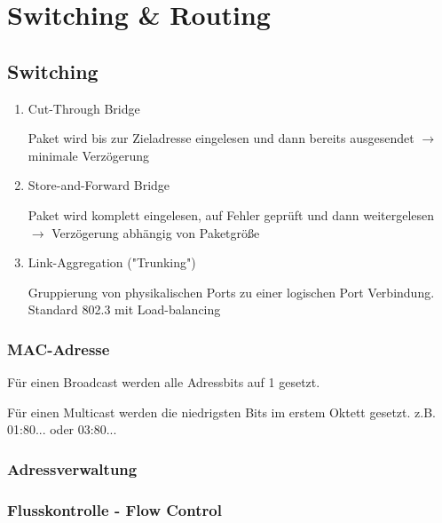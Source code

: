 \documentclass[a4paper]{article}
\title{\docTitle}
\author{Moritz}
\date{\today}
\begin{document}
\maketitle
\tableofcontents


\section{Switching \& Routing}

\subsection{Switching}

\begin{enumerate}
    \item Cut-Through Bridge
    
    Paket wird bis zur Zieladresse eingelesen und dann bereits ausgesendet $\rightarrow$ minimale Verzögerung 
    \item Store-and-Forward Bridge
    
    Paket wird komplett eingelesen, auf Fehler geprüft und dann weitergelesen $\rightarrow$ Verzögerung abhängig von Paketgröße
    \item Link-Aggregation ("Trunking")
    
    Gruppierung von physikalischen Ports zu einer logischen Port Verbindung. Standard 802.3 mit Load-balancing
\end{enumerate}

\subsubsection{MAC-Adresse}

Für einen Broadcast werden alle Adressbits auf 1 gesetzt.

Für einen Multicast werden die niedrigsten Bits im erstem Oktett gesetzt. z.B. 01:80... oder 03:80...

\subsubsection{Adressverwaltung}


\subsubsection{Flusskontrolle - Flow Control}
\end{document}
